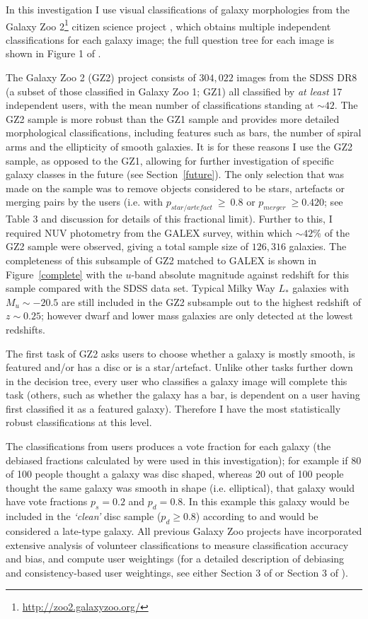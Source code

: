 In this investigation I use visual classifications of galaxy morphologies from the Galaxy Zoo 2\footnote{\url{http://zoo2.galaxyzoo.org/}} citizen science project \citep{GZ2}, which obtains multiple independent classifications for each galaxy image; the full question tree for each image is shown in Figure 1 of \citealt{GZ2}.  

The Galaxy Zoo 2 (GZ2) project consists of $304, 022$ images from the SDSS DR8 (a subset of those classified in Galaxy Zoo 1; GZ1) all classified by \emph{at least} 17 independent users, with the mean number of classifications standing at $\sim42$. The GZ2 sample is more robust than the GZ1 sample and provides more detailed morphological classifications, including features such as bars, the number of spiral arms and the ellipticity of smooth galaxies. It is for these reasons I use the GZ2 sample, as opposed to the GZ1, allowing for further investigation of specific galaxy classes in the future (see Section~\ref{future}). The only selection that was made on the sample was to remove objects considered to be stars, artefacts or merging pairs by the users (i.e. with $p_{star/artefact} ~\geq~ 0.8$ or $p_{merger} ~\geq 0.420$; see \citealt{GZ2} Table 3 and discussion for details of this fractional limit). Further to this, I required NUV photometry from the GALEX survey, within which $\sim42\%$ of the GZ2 sample were observed, giving a total sample size of $126, 316$ galaxies. The completeness of this subsample of GZ2 matched to GALEX is shown in Figure~\ref{complete} with the $u$-band absolute magnitude against redshift for this sample compared with the SDSS data set. Typical Milky Way $L_*$ galaxies with $M_u \sim -20.5$ are still included in the GZ2 subsample out to the highest redshift of $z \sim 0.25$; however dwarf and lower mass galaxies are only detected at the lowest redshifts.

The first task of GZ2 asks users to choose whether a galaxy is mostly smooth, is featured and/or has a disc or is a star/artefact. Unlike other tasks further down in the decision tree, every user who classifies a galaxy image will complete this task (others, such as whether the galaxy has a bar, is dependent on a user having first classified it as a featured galaxy). Therefore I have the most statistically robust classifications at this level.

The classifications from users produces a vote fraction for each galaxy (the debiased fractions calculated by \citet{GZ2} were used in this investigation); for example if 80 of 100 people thought a galaxy was disc shaped, whereas 20 out of 100 people thought the same galaxy was smooth in shape (i.e. elliptical), that galaxy would have vote fractions $p_{s} = 0.2$ and $p_{d} = 0.8$. In this example this galaxy would be included in the \emph{`clean'} disc sample ($p_d \geq 0.8$) according to \cite{GZ2} and would be considered a late-type galaxy. All previous Galaxy Zoo projects have incorporated extensive analysis of volunteer classifications to measure classification accuracy and bias, and compute user weightings (for a detailed description of debiasing and consistency-based user weightings, see either Section 3 of \citealt{Lintott09} or Section 3 of \citealt{GZ2}). 

